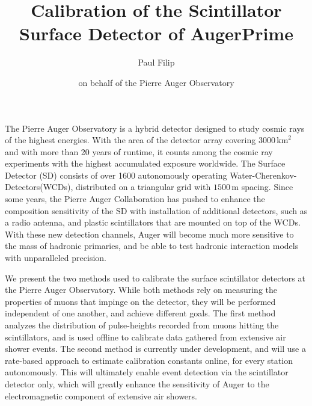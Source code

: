\documentclass{scrartcl}
\title{Calibration of the Scintillator Surface Detector of AugerPrime}
\author[1]{Paul Filip}
\author[2]{on behalf of the Pierre Auger Observatory}
\affil[1]{Karlsruhe Institute for Technology, Germany}
\affil[2]{Malargüe, Mendoza Province, Argentina}
\date{}
\begin{document}
\maketitle

The Pierre Auger Observatory is a hybrid detector designed to study cosmic rays of the highest energies.
With the area of the detector array covering $3000\,\text{km}^2$ and with more than 20 years of runtime, it counts among the cosmic ray experiments with the highest accumulated exposure worldwide.
The Surface Detector (SD) consists of over 1600 autonomously operating Water-Cherenkov-Detectors(WCDs), distributed on a triangular grid with $1500\,\text{m}$ spacing. Since some years, the Pierre Auger Collaboration has pushed to enhance the composition sensitivity of the SD with installation of additional detectors, such as a radio antenna, and plastic scintillators that are mounted on top of the WCDs. With these new detection channels, Auger will become much more sensitive to the mass of hadronic primaries, and be able to test hadronic interaction models with unparalleled precision. 

We present the two methods used to calibrate the surface scintillator detectors at the Pierre Auger Observatory. While both methods rely on measuring the properties of muons that impinge on the detector, they will be performed independent of one another, and achieve different goals.
The first method analyzes the distribution of pulse-heights recorded from muons hitting the scintillators, and is used offline to calibrate data gathered from extensive air shower events.
The second method is currently under development, and will use a rate-based approach to estimate calibration constants online, for every station autonomously. This will ultimately enable event detection via the scintillator detector only, which will greatly enhance the sensitivity of Auger to the electromagnetic component of extensive air showers.
\end{document}
